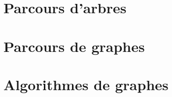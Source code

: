 \documentclass[11pt,fleqn,french]{book} %
\begin{document}
\part{Parcours d'arbres}










\part{Parcours de graphes}









\part{Algorithmes de graphes}







\end{document}
